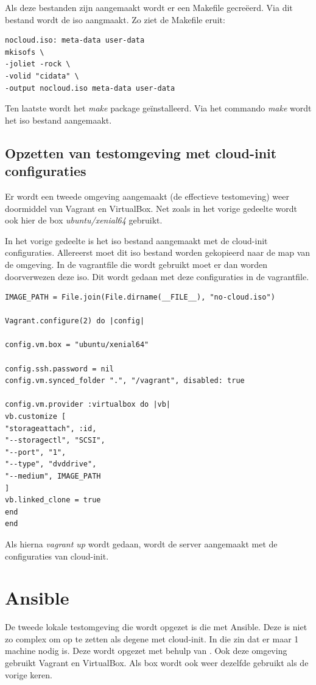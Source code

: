 Als deze bestanden zijn aangemaakt wordt er een Makefile gecreëerd. Via dit bestand wordt de iso aangmaakt. Zo ziet de Makefile eruit:
\begin{lstlisting}
nocloud.iso: meta-data user-data
mkisofs \
-joliet -rock \
-volid "cidata" \
-output nocloud.iso meta-data user-data
\end{lstlisting}

Ten laatste wordt het \textit{make} package geïnstalleerd. Via het commando \textit{make} wordt het iso bestand aangemaakt.

\subsection{Opzetten van testomgeving met cloud-init configuraties}
Er wordt een tweede omgeving aangemaakt (de effectieve testomeving) weer doormiddel van Vagrant en VirtualBox. Net zoals in het vorige gedeelte wordt ook hier de box \textit{ubuntu/xenial64} gebruikt.

In het vorige gedeelte is het iso bestand aangemaakt met de cloud-init configuraties. Allereerst moet dit iso bestand worden gekopieerd naar de map van de omgeving. In de vagrantfile die wordt gebruikt moet er dan worden doorverwezen deze iso. Dit wordt gedaan met deze configuraties in de vagrantfile.
\begin{lstlisting}
IMAGE_PATH = File.join(File.dirname(__FILE__), "no-cloud.iso")

Vagrant.configure(2) do |config|

config.vm.box = "ubuntu/xenial64"

config.ssh.password = nil	
config.vm.synced_folder ".", "/vagrant", disabled: true

config.vm.provider :virtualbox do |vb|
vb.customize [
"storageattach", :id,
"--storagectl", "SCSI",
"--port", "1",
"--type", "dvddrive",
"--medium", IMAGE_PATH
]
vb.linked_clone = true
end
end
\end{lstlisting}
Als hierna \textit{vagrant up} wordt gedaan, wordt de server aangemaakt met de configuraties van cloud-init.

\section{Ansible}
De tweede lokale testomgeving die wordt opgezet is die met Ansible. Deze is niet zo complex om op te zetten als degene met cloud-init. In die zin dat er maar 1 machine nodig is. Deze wordt opgezet met behulp van \autocite{ansibleVagrant}. Ook deze omgeving gebruikt Vagrant en VirtualBox. Als box wordt ook weer dezelfde gebruikt als de vorige keren. 

